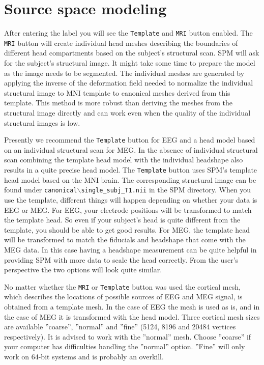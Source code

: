 \section{Source space modeling}

After entering the label you will see the \texttt{Template} and \texttt{MRI} button enabled. The \texttt{MRI} button will create individual head meshes describing the boundaries of different head compartments based on the subject's structural scan. SPM will ask for the subject's structural image. It might take some time to prepare the model as the image  needs to be segmented. The individual meshes are generated by applying the inverse of the deformation field needed to normalize the individual structural image to MNI template to canonical meshes derived from this template. This method is more robust than deriving the meshes from the structural image directly and can work even when the quality of the individual structural images is low.

Presently we recommend the \texttt{Template} button for EEG and a head model based on an individual structural scan for MEG. In the absence of individual structural scan combining the template head model with the individual headshape also results in a quite precise head model. The \texttt{Template} button uses SPM's template head model based on the MNI brain. The corresponding structural image can be found under \texttt{canonical$\backslash$single\_subj\_T1.nii} in the SPM directory. When you use the template, different things will happen depending on whether your data is EEG or MEG. For EEG, your electrode positions will be transformed to match the template head. So even if your subject's head is quite different from the template, you should be able to get good results. For MEG, the template head will be transformed to match the fiducials and headshape that come with the MEG data. In this case having a headshape measurement can be quite helpful in providing SPM with more data to scale the head correctly. From the user's perspective the two options will look quite similar.

No matter whether the \texttt{MRI} or \texttt{Template} button was used the cortical mesh, which describes the locations of possible sources of EEG and MEG signal, is obtained from a template mesh. In the case of EEG the mesh is used as is, and in the case of MEG it is transformed with the head model. Three cortical mesh sizes are available ''coarse'', ''normal'' and ''fine'' (5124, 8196 and 20484 vertices respectively).  It is advised to work with the ''normal'' mesh. Choose ''coarse'' if your computer has difficulties handling the ''normal'' option. ''Fine'' will only work on 64-bit systems and is probably an overkill.


